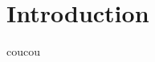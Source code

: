 \thispagestyle{empty}\cleardoublepage
\titleformat{\chapter}[display]
		{\normalfont\huge\bfseries}{}{20pt}{\Huge}
\chapter{Introduction}

coucou~\cite{sarazin:4214}
